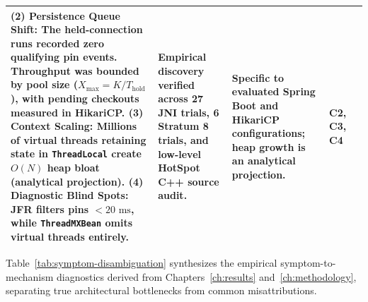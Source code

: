 \begin{table}[htbp]
\begin{tabularx}{\textwidth}{@{}p{}>{\raggedright\arraybackslash}X>{\raggedright\arraybackslash}p{}>{\raggedright\arraybackslash}p{}p{}@{}}
    (2) \textbf{Persistence Queue Shift:} The held-connection runs recorded zero qualifying pin events. Throughput was bounded by pool size ($X_{\text{max}} = K / T_{\text{hold}}$), with pending checkouts measured in HikariCP.
    (3) \textbf{Context Scaling:} Millions of virtual threads retaining state in \texttt{ThreadLocal} create $O(N)$ heap bloat (analytical projection).
    (4) \textbf{Diagnostic Blind Spots:} JFR filters pins $<20\text{ ms}$, while \texttt{ThreadMXBean} omits virtual threads entirely. & Empirical discovery verified across 27 JNI trials, 6 Stratum 8 trials, and low-level HotSpot C++ source audit. & Specific to evaluated Spring Boot and HikariCP configurations; heap growth is an analytical projection. & C2, C3, C4 \\
    \bottomrule
  \end{tabularx}
\end{table}

Table~\ref{tab:symptom-disambiguation} synthesizes the empirical symptom-to-mechanism diagnostics derived from Chapters~\ref{ch:results} and~\ref{ch:methodology}, separating true architectural bottlenecks from common misattributions.

